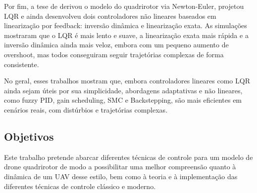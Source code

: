 Por fim, a tese de \cite{thesis} derivou o modelo do quadrirotor via Newton-Euler, projetou LQR e ainda desenvolveu dois controladores não lineares baseados em linearização por feedback: inversão dinâmica e linearização exata. As simulações mostraram que o LQR é mais lento e suave, a linearização exata mais rápida e a inversão dinâmica ainda mais veloz, embora com um pequeno aumento de overshoot, mas todos conseguiram seguir trajetórias complexas de forma consistente.

No geral, esses trabalhos mostram que, embora controladores lineares como LQR ainda sejam úteis por sua simplicidade, abordagens adaptativas e não lineares, como fuzzy PID, gain scheduling, SMC e Backstepping, são mais eficientes em cenários reais, com distúrbios e trajetórias complexas.

\subsection{Objetivos}
Este trabalho pretende abarcar diferentes técnicas de controle para um modelo de drone quadrirotor de modo a possibilitar uma melhor compreensão quanto à dinâmica de um UAV desse estilo, bem como à teoria e à implementação das diferentes técnicas de controle clássico e moderno.
